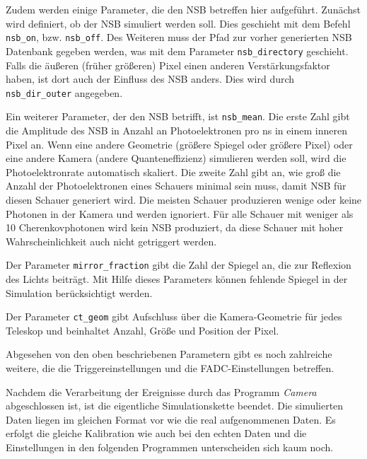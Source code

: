 Zudem werden einige Parameter, die den NSB betreffen hier aufgeführt.
Zunächst wird definiert, ob der NSB simuliert werden soll. 
Dies geschieht mit dem Befehl \texttt{nsb\_on}, bzw. \texttt{nsb\_off}.
Des Weiteren muss der Pfad zur vorher generierten NSB Datenbank gegeben werden, was mit dem Parameter \texttt{nsb\_directory} geschieht.
Falls die äußeren (früher größeren) Pixel einen anderen Verstärkungsfaktor haben, ist dort auch der Einfluss des NSB anders. 
Dies wird durch \texttt{nsb\_dir\_outer} angegeben.

Ein weiterer Parameter, der den NSB betrifft, ist \texttt{nsb\_mean}.
Die erste Zahl gibt die Amplitude des NSB in Anzahl an Photoelektronen pro ns in einem inneren Pixel an.
Wenn eine andere Geometrie (größere Spiegel oder größere Pixel) oder eine andere Kamera (andere Quanteneffizienz) simulieren werden soll, wird die Photoelektronrate automatisch skaliert.
Die zweite Zahl gibt an, wie groß die Anzahl der Photoelektronen eines Schauers minimal sein muss, damit NSB für diesen Schauer generiert wird.
Die meisten Schauer produzieren wenige oder keine Photonen in der Kamera und werden ignoriert.
Für alle Schauer mit weniger als 10 Cherenkovphotonen wird kein NSB produziert, da diese Schauer mit hoher Wahrscheinlichkeit auch nicht getriggert werden.

Der Parameter \texttt{mirror\_fraction} gibt die Zahl der Spiegel an, die zur Reflexion des Lichts beiträgt. 
Mit Hilfe dieses Parameters können fehlende Spiegel in der Simulation berücksichtigt werden.

Der Parameter \texttt{ct\_geom} gibt Aufschluss über die Kamera-Geometrie für jedes Teleskop und beinhaltet Anzahl, Größe und Position der Pixel.

Abgesehen von den oben beschriebenen Parametern gibt es noch zahlreiche weitere, die die Triggereinstellungen und die FADC-Einstellungen betreffen.

Nachdem die Verarbeitung der Ereignisse durch das Programm \textit{Camera} abgeschlossen ist, ist die eigentliche Simulationskette beendet.
Die simulierten Daten liegen im gleichen Format vor wie die real aufgenommenen Daten.
Es erfolgt die gleiche Kalibration wie auch bei den echten Daten und die Einstellungen in den folgenden Programmen unterscheiden sich kaum noch.

